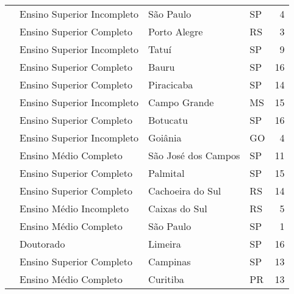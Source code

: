 \begin{table}[h]
\begin{tabular}{|l|l|l|l|r|}
                             & Ensino Superior Incompleto     & São Paulo           & SP & 4                       \\ \cline{2-5} 
                             & Ensino Superior Completo       & Porto Alegre        & RS & 3                       \\ \cline{2-5} 
                             & Ensino Superior Incompleto     & Tatuí               & SP & 9                      \\ \cline{2-5} 
                             & Ensino Superior Completo       & Bauru               & SP & 16                      \\ \cline{2-5} 
                             & Ensino Superior Completo       & Piracicaba          & SP & 14                      \\ \cline{2-5} 
                             & Ensino Superior Incompleto     & Campo Grande        & MS & 15                      \\ \cline{2-5} 
                             & Ensino Superior Completo       & Botucatu            & SP & 16                      \\ \cline{2-5} 
                             & Ensino Superior Incompleto     & Goiânia             & GO & 4                       \\ \cline{2-5} 
                             & Ensino Médio Completo          & São José dos Campos & SP & 11                      \\ \cline{2-5} 
                             & Ensino Superior Completo       & Palmital            & SP & 15                      \\ \cline{2-5} 
                             & Ensino Superior Completo       & Cachoeira do Sul    & RS & 14                      \\ \cline{2-5} 
                             & Ensino Médio Incompleto        & Caixas do Sul       & RS & 5                       \\ \cline{2-5} 
                             & Ensino Médio Completo          & São Paulo           & SP & 1                       \\ \cline{2-5} 
                             & Doutorado                      & Limeira             & SP & 16                      \\ \cline{2-5} 
                             & Ensino Superior Completo       & Campinas            & SP & 13                      \\ \cline{2-5} 
                             & Ensino Médio Completo          & Curitiba            & PR & 13                      \\ \cline{2-5} 

\end{tabular}
\end{table}
